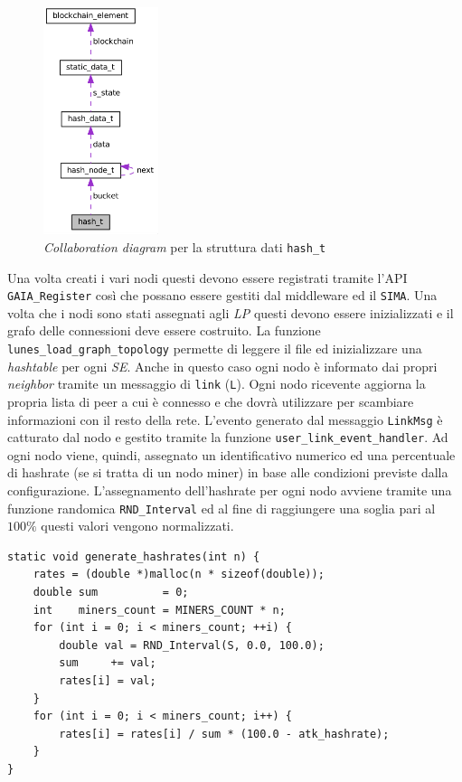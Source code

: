 \begin{figure}[H]
    \centering
    \includegraphics[width=0.3\textwidth]{images/collaboration_hasht.png}
    \caption{\textit{Collaboration diagram} per la struttura dati \texttt{hash\_t}}
\end{figure}
Una volta creati i vari nodi questi devono essere registrati tramite l'API \texttt{GAIA\_Register} così che possano essere gestiti dal middleware ed il \texttt{SIMA}. Una volta che i nodi sono stati assegnati agli \textit{LP} questi devono essere inizializzati e il grafo delle connessioni deve essere costruito.\newline
La funzione \texttt{lunes\_load\_graph\_topology} permette di leggere il file ed inizializzare una \textit{hashtable} per ogni \textit{SE}. Anche in questo caso ogni nodo è informato dai propri \textit{neighbor} tramite un messaggio di \texttt{link} (\texttt{L}). Ogni nodo ricevente aggiorna la propria lista di peer a cui è connesso e che dovrà utilizzare per scambiare informazioni con il resto della rete. L'evento generato dal messaggio \texttt{LinkMsg} è catturato dal nodo e gestito tramite la funzione \texttt{user\_link\_event\_handler}. Ad ogni nodo viene, quindi, assegnato un identificativo numerico ed una percentuale di hashrate (se si tratta di un nodo miner) in base alle condizioni previste dalla configurazione. L'assegnamento dell'hashrate per ogni nodo avviene tramite una funzione randomica \texttt{RND\_Interval} ed al fine di raggiungere una soglia pari al $100\%$ questi valori vengono normalizzati.
\begin{code}
\begin{verbatim}
static void generate_hashrates(int n) {
    rates = (double *)malloc(n * sizeof(double));
    double sum          = 0;
    int    miners_count = MINERS_COUNT * n;
    for (int i = 0; i < miners_count; ++i) {
        double val = RND_Interval(S, 0.0, 100.0);
        sum     += val;
        rates[i] = val;
    }
    for (int i = 0; i < miners_count; i++) {
        rates[i] = rates[i] / sum * (100.0 - atk_hashrate);
    }
}
\end{verbatim}
\end{code}
